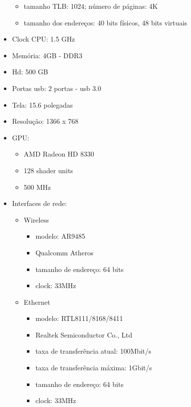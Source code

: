 \documentclass[11pt]{article}
\begin{document}
\begin{itemize}
\begin{itemize}
\begin{table}[h]
           \end{table}
            \item tamanho TLB: 1024; número de páginas: 4K
            \item tamanho dos endereços: 40 bits físicos, 48 bits virtuais
           \end{itemize}
           \item Clock CPU: 1.5 GHz
           \item Memória: 4GB - DDR3
           \item Hd: 500 GB
           \item Portas usb: 2 portas - usb 3.0
           \item Tela: 15.6 polegadas
           \item Resolução: 1366 x 768
           \newpage
           \item GPU:
                \begin{itemize}
                   \item AMD Radeon HD 8330
                   \item 128 shader units
                   \item 500 MHz
                \end{itemize}

           \item Interfaces de rede:
                  \begin{itemize}
                     \item Wireless
                        \begin{itemize}
                           \item modelo: AR9485
                           \item Qualcomm Atheros
                           \item tamanho de endereço: 64 bits
                           \item clock: 33MHz
                        \end{itemize}
                     \item Ethernet
                        \begin{itemize}
                           \item modelo: RTL8111/8168/8411
                           \item Realtek Semiconductor Co., Ltd
                           \item taxa de transferência atual: 100Mbit/s
                           \item taxa de transferência máxima: 1Gbit/s
                           \item tamanho de endereço: 64 bits
                           \item clock: 33MHz
                        \end{itemize}
                  \end{itemize}
       \end{itemize}
\end{document}
